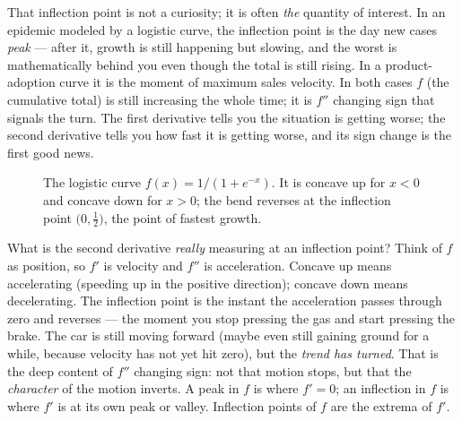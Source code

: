 \begin{applicationbox}
That inflection point is not a curiosity; it is often \emph{the} quantity of
interest. In an epidemic modeled by a logistic curve, the inflection point is the
day new cases \emph{peak} --- after it, growth is still happening but slowing, and
the worst is mathematically behind you even though the total is still rising. In a
product-adoption curve it is the moment of maximum sales velocity. In both cases
$f$ (the cumulative total) is still increasing the whole time; it is $f''$ changing
sign that signals the turn. The first derivative tells you the situation is getting
worse; the second derivative tells you how fast it is getting worse, and its sign
change is the first good news.
\end{applicationbox}

\begin{figure}[H]
\centering
{}
\caption{The logistic curve $f(x)=1/(1+e^{-x})$. It is concave up for $x<0$ and
concave down for $x>0$; the bend reverses at the inflection point
$\big(0,\tfrac12\big)$, the point of fastest growth.}
\label{ch16:fig-logistic}
\end{figure}

\begin{happeningbox}
What is the second derivative \emph{really} measuring at an inflection point?
Think of $f$ as position, so $f'$ is velocity and $f''$ is acceleration. Concave up
means accelerating (speeding up in the positive direction); concave down means
decelerating. The inflection point is the instant the acceleration passes through
zero and reverses --- the moment you stop pressing the gas and start pressing the
brake. The car is still moving forward (maybe even still gaining ground for a
while, because velocity has not yet hit zero), but the \emph{trend has turned}.
That is the deep content of $f''$ changing sign: not that motion stops, but that
the \emph{character} of the motion inverts. A peak in $f$ is where $f'=0$; an
inflection in $f$ is where $f'$ is at its own peak or valley. Inflection points of
$f$ are the extrema of $f'$.
\end{happeningbox}

